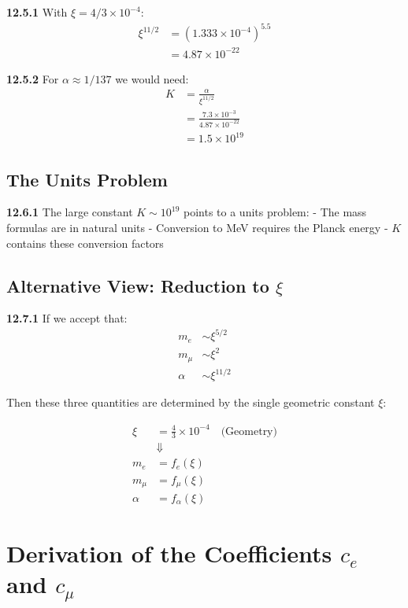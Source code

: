 \noindent \textbf{12.5.1} With $\xi = 4/3 \times 10^{-4}$:
\begin{align}
	\xi^{11/2} &= (1.333 \times 10^{-4})^{5.5} \\
	&= 4.87 \times 10^{-22}
\end{align}

\noindent \textbf{12.5.2} For $\alpha \approx 1/137$ we would need:
\begin{align}
	K &= \frac{\alpha}{\xi^{11/2}} \\
	&= \frac{7.3 \times 10^{-3}}{4.87 \times 10^{-22}} \\
	&= 1.5 \times 10^{19}
\end{align}

\subsection{The Units Problem}

\noindent \textbf{12.6.1} The large constant $K \sim 10^{19}$ points to a units problem:
- The mass formulas are in natural units
- Conversion to MeV requires the Planck energy
- $K$ contains these conversion factors

\subsection{Alternative View: Reduction to $\xi$}

\noindent \textbf{12.7.1} If we accept that:
\begin{align}
	m_e &\sim \xi^{5/2} \\
	m_\mu &\sim \xi^2 \\
	\alpha &\sim \xi^{11/2}
\end{align}

Then these three quantities are determined by the single geometric constant $\xi$:

\begin{equation}
	\boxed{
		\begin{aligned}
			\xi &= \frac{4}{3} \times 10^{-4} \quad \text{(Geometry)} \\
			&\Downarrow \\
			m_e &= f_e(\xi) \\
			m_\mu &= f_\mu(\xi) \\
			\alpha &= f_\alpha(\xi)
		\end{aligned}
	}
\end{equation}

\section{Derivation of the Coefficients $c_e$ and $c_\mu$}

